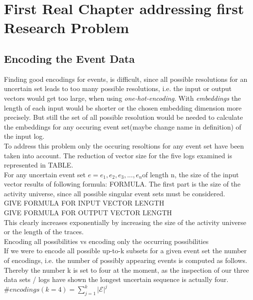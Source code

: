 \documentclass[
	a4paper,
	pagesize,
	pdftex,
	12pt,
	ngerman,
	fleqn,
	final,
	]{scrartcl}
\theoremstyle{plain}
\theoremstyle{definition}
\begin{document}
\section{First Real Chapter addressing first Research Problem}

	\subsection{Encoding the Event Data}
	Finding good encodings for events, is difficult, since all possible resolutions for an uncertain set leads to too many possible resolutions, i.e. the input or output vectors would get too large, when using \textit{one-hot-encoding}. With \textit{embeddings} the length of each input would be shorter or the chosen embedding dimension more precisely. But still the set of all possible resolution would be needed to calculate the embeddings for any occuring event set(maybe change name in definition) of the input log. \\
	To address this problem only the occuring resoltions for any event set have been taken into account. The reduction of vector size for the five logs examined is represented in TABLE. \\
	For any uncertain event set \(e = {e_1, e_2, e_3, ..., e_n}\)of length n, the size of the input vector results of following formula: FORMULA. The first part is the size of the activity universe, since all possible singular event sets must be considered. \\
	GIVE FORMULA FOR INPUT VECTOR LENGTH \\
	GIVE FORMULA FOR OUTPUT VECTOR LENGTH \\
	This clearly increases exponentially by increasing the size of the activity universe or the length of the traces.  \\ 
	Encoding all possibilities vs encoding only the occurring possibilities \\
	If we were to encode all possible up-to-k subsets for a given event set the number of encodings, i.e. the number of possibly appearing events is computed as follows. Thereby the number k is set to four at the moment, as the inspection of our three data sets / logs have shown the longest uncertain sequence is actually four.\\
	\(\#encodings(k=4)= \sum_{j=1}^{k}|\mathcal{E}|^j\) \\
\end{document}
